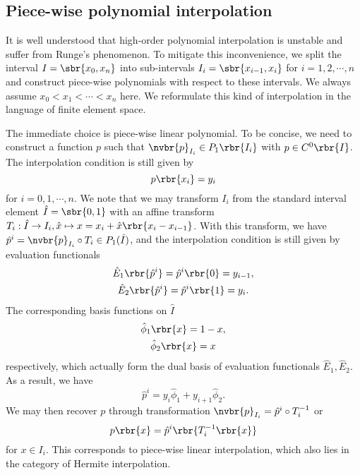 \documentclass[english, nochinese]{pnote}
\begin{document}
\subsection{Piece-wise polynomial interpolation}

It is well understood that high-order polynomial interpolation is unstable and suffer from Runge's phenomenon. To mitigate this inconvenience, we split the interval $ I = \sbr{ x_0, x_n } $ into sub-intervals $ I_i = \sbr{ x_{ i - 1 }, x_i } $ for $ i = 1, 2, \cdots, n $ and construct piece-wise polynomials with respect to these intervals. We always assume $ x_0 < x_1 < \cdots < x_n $ here. We reformulate this kind of interpolation in the language of finite element space.

The immediate choice is piece-wise linear polynomial. To be concise, we need to construct a function $p$ such that $ \nvbr{p}_{I_i} \in P_1 \rbr{I_i} $ with $ p \in C^0 \rbr{I} $. The interpolation condition is still given by
\begin{equation}
p \rbr{x_i} = y_i
\end{equation}
for $ i = 0, 1, \cdots, n $. We note that we may transform $I_i$ from the standard interval element $ \hat{I} = \sbr{ 0, 1 } $ with an affine transform $ T_i : \hat{I} \rightarrow I_i, \hat{x} \mapsto x = x_i + \hat{x} \rbr{ x_i - x_{ i - 1 } } $. With this transform, we have $ \hat{p}^i = \nvbr{p}_{I_i} \circ T_i \in P_1 (\hat{I}) $, and the interpolation condition is still given by evaluation functionals
\begin{gather}
\hat{E}_1 \rbr{\hat{p}^i} = \hat{p}^i \rbr{0} = y_{ i - 1 }, \\
\hat{E}_2 \rbr{\hat{p}^i} = \hat{p}^i \rbr{1} = y_i.
\end{gather}
The corresponding basis functions on $\hat{I}$
\begin{gather}
\hat{\phi}_1 \rbr{x} = 1 - x, \\
\hat{\phi}_2 \rbr{x} = x
\end{gather}
respectively, which actually form the dual basis of evaluation functionals $ \hat{E}_1, \hat{E}_2 $. As a result, we have
\begin{equation}
\hat{p}^i = y_i \hat{\phi}_1 + y_{ i + 1 } \hat{\phi}_2.
\end{equation}
We may then recover $p$ through transformation $ \nvbr{p}_{I_i} = \hat{p}^i \circ T_i^{-1} $ or
\begin{equation}
p \rbr{x} = \hat{p}^i \rbr{ T_i^{-1} \rbr{x} }
\end{equation}
for $ x \in I_i $. This corresponds to piece-wise linear interpolation, which also lies in the category of Hermite interpolation.
\end{document}
